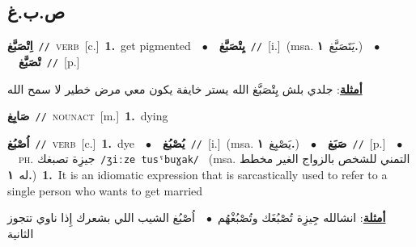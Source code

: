 \documentclass[10pt,a4paper,twoside]{article} %
\begin{document}
\begin{multicols}{2}
{{{{{{{\vspace{-3mm}
\subsection*{\color{blue}\foreignlanguage{arabic}{ص.ب.غ}\color{blue}{}} 

{\setlength\topsep{0pt}\textbf{\foreignlanguage{arabic}{اِتْصَبَّغ}}\ {\color{gray}\texttt{//}\color{black}}\ \textsc{verb}\ [c.]\ \textbf{1.}~get pigmented\ \ $\bullet$\ \ \setlength\topsep{0pt}\textbf{\foreignlanguage{arabic}{يِتْصَبَّغ}}\ {\color{gray}\texttt{//}\color{black}}\ [i.]\ \color{gray}(msa. \foreignlanguage{arabic}{يَتَصَبَّغ}~\foreignlanguage{arabic}{\textbf{١.}})\color{black}\ \ $\bullet$\ \ \setlength\topsep{0pt}\textbf{\foreignlanguage{arabic}{تْصَبَّغ}}\ {\color{gray}\texttt{//}\color{black}}\ [p.]\  \begin{flushright}\color{gray}\foreignlanguage{arabic}{\textbf{\underline{\foreignlanguage{arabic}{أمثلة}}}: جلدي بلش يِتْصَبَّغ الله يستر خايفة يكون معي مرض خطير لا سمح الله}\end{flushright}\color{black}} \vspace{2mm}

{\setlength\topsep{0pt}\textbf{\foreignlanguage{arabic}{صَابِغ}}\ {\color{gray}\texttt{//}\color{black}}\ \textsc{noun\textunderscore act}\ [m.]\ \textbf{1.}~dying\ 

{\setlength\topsep{0pt}\textbf{\foreignlanguage{arabic}{اُصْبُغ}}\ {\color{gray}\texttt{//}\color{black}}\ \textsc{verb}\ [c.]\ \textbf{1.}~dye\ \ $\bullet$\ \ \setlength\topsep{0pt}\textbf{\foreignlanguage{arabic}{يُصْبُغ}}\ {\color{gray}\texttt{//}\color{black}}\ [i.]\ \color{gray}(msa. \foreignlanguage{arabic}{يَصْبِغ}~\foreignlanguage{arabic}{\textbf{١.}})\color{black}\ \ $\bullet$\ \ \setlength\topsep{0pt}\textbf{\foreignlanguage{arabic}{صَبَغ}}\ {\color{gray}\texttt{//}\color{black}}\ [p.]\ \ $\bullet$\ \ \textsc{ph.} \color{gray} \foreignlanguage{arabic}{جيزِة تصبغك}\color{black}\ {\color{gray}\texttt{/{\sffamily ʒiːze tusˤbuɣak}/}\color{black}}\ \color{gray} (msa. \foreignlanguage{arabic}{التمني للشخص بالزواج الغير مخطط له}~\foreignlanguage{arabic}{\textbf{١.}})\color{black}\ \textbf{1.}~It is an idiomatic expression that is sarcastically used to refer to a single person who wants to get married\  \begin{flushright}\color{gray}\foreignlanguage{arabic}{\textbf{\underline{\foreignlanguage{arabic}{أمثلة}}}: انشالله جِيزِة تُصْبُغَك وتُصْبُغْهُم\ $\bullet$\ \  اُصْبُغ الشيب اللي بشعرك إِذا ناوي تتجوز الثانية}\end{flushright}\color{black}} \vspace{2mm}

}}}}}}}}
\end{multicols}
\end{document}
